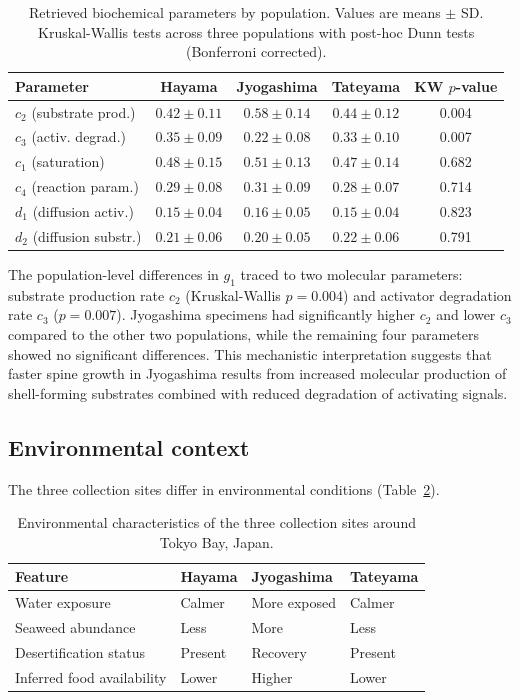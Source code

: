 \documentclass[11pt]{article}
\begin{document}
\begin{table}[H]
\centering
\caption{Retrieved biochemical parameters by population. Values are means $\pm$ SD. Kruskal-Wallis tests across three populations with post-hoc Dunn tests (Bonferroni corrected).}
\label{tab:molecular}
\begin{tabular}{lcccc}
\toprule
\textbf{Parameter} & \textbf{Hayama} & \textbf{Jyogashima} & \textbf{Tateyama} & \textbf{KW $p$-value} \\
\midrule
$c_2$ (substrate prod.) & $0.42 \pm 0.11$ & $\mathbf{0.58 \pm 0.14}$ & $0.44 \pm 0.12$ & 0.004 \\
$c_3$ (activ. degrad.) & $0.35 \pm 0.09$ & $\mathbf{0.22 \pm 0.08}$ & $0.33 \pm 0.10$ & 0.007 \\
$c_1$ (saturation) & $0.48 \pm 0.15$ & $0.51 \pm 0.13$ & $0.47 \pm 0.14$ & 0.682 \\
$c_4$ (reaction param.) & $0.29 \pm 0.08$ & $0.31 \pm 0.09$ & $0.28 \pm 0.07$ & 0.714 \\
$d_1$ (diffusion activ.) & $0.15 \pm 0.04$ & $0.16 \pm 0.05$ & $0.15 \pm 0.04$ & 0.823 \\
$d_2$ (diffusion substr.) & $0.21 \pm 0.06$ & $0.20 \pm 0.05$ & $0.22 \pm 0.06$ & 0.791 \\
\bottomrule
\end{tabular}
\end{table}

The population-level differences in $g_1$ traced to two molecular parameters: substrate production rate $c_2$ (Kruskal-Wallis $p = 0.004$) and activator degradation rate $c_3$ ($p = 0.007$). Jyogashima specimens had significantly higher $c_2$ and lower $c_3$ compared to the other two populations, while the remaining four parameters showed no significant differences. This mechanistic interpretation suggests that faster spine growth in Jyogashima results from increased molecular production of shell-forming substrates combined with reduced degradation of activating signals.

\subsection{Environmental context}

The three collection sites differ in environmental conditions (Table~\ref{tab:environment}).

\begin{table}[H]
\centering
\caption{Environmental characteristics of the three collection sites around Tokyo Bay, Japan.}
\label{tab:environment}
\begin{tabular}{llll}
\toprule
\textbf{Feature} & \textbf{Hayama} & \textbf{Jyogashima} & \textbf{Tateyama} \\
\midrule
Water exposure & Calmer & More exposed & Calmer \\
Seaweed abundance & Less & More & Less \\
Desertification status & Present & Recovery & Present \\
Inferred food availability & Lower & Higher & Lower \\
\bottomrule
\end{tabular}
\end{table}
\end{document}
